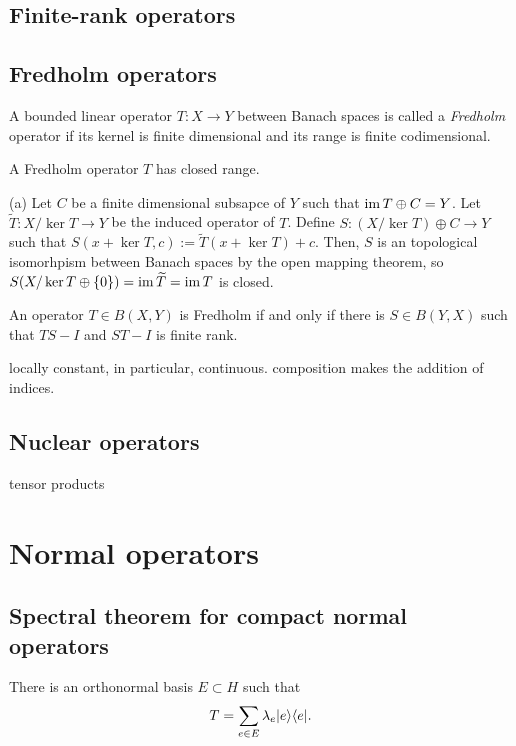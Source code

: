 \documentclass{../note}
\begin{document}
\section{Finite-rank operators}
\section{Fredholm operators}

\begin{prb}
A bounded linear operator $T:X\to Y$ between Banach spaces is called a \emph{Fredholm} operator if its kernel is finite dimensional and its range is finite codimensional.
\begin{parts}
\item A Fredholm operator $T$ has closed range.
\end{parts}
\end{prb}
\begin{pf}
(a)
Let $C$ be a finite dimensional subsapce of $Y$ such that $\operatorname{im} T\oplus C=Y$.
Let $\tilde T:X/\ker T\to Y$ be the induced operator of $T$.
Define $S:(X/\ker T)\oplus C\to Y$ such that $S(x+\ker T,c):=\tilde T(x+\ker T)+c$.
Then, $S$ is an topological isomorhpism between Banach spaces by the open mapping theorem, so $S(X/\ker T\oplus\{0\})=\operatorname{im}\widetilde T=\operatorname{im} T$ is closed.
\end{pf}

\begin{prb}
An operator $T\in B(X,Y)$ is Fredholm if and only if there is $S\in B(Y,X)$ such that $TS-I$ and $ST-I$ is finite rank.
\end{prb}

\begin{prb}
locally constant, in particular, continuous.
composition makes the addition of indices.
\end{prb}

\section{Nuclear operators}
tensor products



\chapter{Normal operators}
\section{Spectral theorem for compact normal operators}
There is an orthonormal basis $E\subset H$ such that
\[T=\sum_{e\in E}\lambda_e|e\rangle\langle e|.\]
\end{document}
